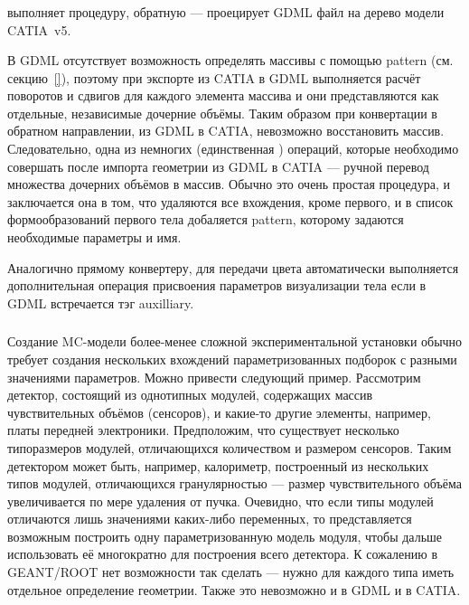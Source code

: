 \subsubsection{}\label{sec:GDML2CATIA}

 выполняет процедуру, обратную  --- проецирует GDML файл на дерево модели CATIA~v5.

В GDML отсутствует возможность определять массивы с помощью pattern (см. секцию~\ref{}),
поэтому при экспорте из CATIA в GDML выполняется расчёт поворотов и сдвигов для каждого элемента массива и они представляются как отдельные, независимые дочерние объёмы. Таким образом при конвертации в обратном направлении, из GDML в CATIA, невозможно восстановить массив. Следовательно, одна из немногих (единственная \todo) операций, которые необходимо совершать после импорта геометрии из GDML в CATIA --- ручной перевод множества дочерних объёмов в массив. Обычно это очень простая процедура, и заключается она в том, что удаляются все вхождения, кроме первого, и в список формообразований первого тела добаляется pattern, которому задаются необходимые параметры и имя.

Аналогично прямому конвертеру, для передачи цвета автоматически выполняется дополнительная операция присвоения параметров визуализации тела если в GDML встречается тэг auxilliary.

\subsubsection{}\label{sec:Duplicator}

Создание MC-модели более-менее сложной экспериментальной установки обычно требует создания нескольких вхождений параметризованных подборок с разными значениями параметров. Можно привести следующий пример. Рассмотрим детектор, состоящий из однотипных модулей, содержащих массив чувствительных объёмов (сенсоров), и какие-то другие элементы, например, платы передней электроники. Предположим, что существует несколько типоразмеров модулей, отличающихся количеством и размером сенсоров. Таким детектором может быть, например, калориметр, построенный из нескольких типов модулей, отличающихся гранулярностью --- размер чувствительного объёма увеличивается по мере удаления от пучка. Очевидно, что если типы модулей отличаются лишь значениями каких-либо переменных, то представляется возможным построить одну параметризованную модель модуля, чтобы дальше использовать её многократно для построения всего детектора. К сожалению в GEANT/ROOT нет возможности так сделать --- нужно для каждого типа иметь отдельное определение геометрии. Также это невозможно и в GDML и в CATIA.

